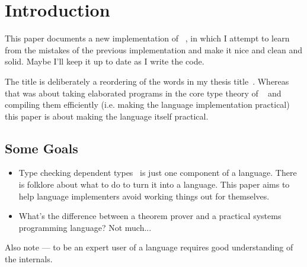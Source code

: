 \section{Introduction}

This paper documents a new implementation of \Idris{}~\cite{Brady2011a}, in which
I attempt to learn from the mistakes of the previous implementation and make
it nice and clean and solid. Maybe I'll keep it up to date as I write the
code.

The title is deliberately a reordering of the words in my thesis
title~\cite{Brady2005}. Whereas that was about taking elaborated programs
in the core type theory of \Epigram{}~\cite{McBride2004a} and compiling them
efficiently (i.e. making the language implementation practical) this paper is
about making the language itself practical. 

\subsection{Some Goals}

\begin{itemize}
\item Type checking dependent types~\cite{Chapman2005epigram,loh2010tutorial} is just one component
 of a language. There is folklore about what to do to turn it into a language. This
 paper aims to help language implementers avoid working things out for themselves.
\item What's the difference between a theorem prover and a practical systems programming
 language? Not much...
\end{itemize}

Also note --- to be an expert user of a language requires good understanding of the internals.
